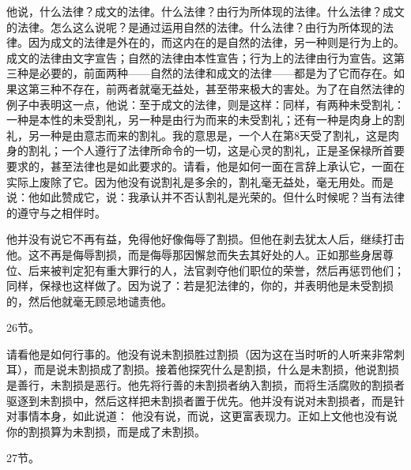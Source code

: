 他说，什么法律？成文的法律。什么法律？由行为所体现的法律。什么法律？成文的法律。怎么这么说呢？是通过运用自然的法律。什么法律？由行为所体现的法律。因为成文的法律是外在的，而这内在的是自然的法律，另一种则是行为上的。成文的法律由文字宣告；自然的法律由本性宣告；行为上的法律由行为宣告。这第三种是必要的，前面两种——自然的法律和成文的法律——都是为了它而存在。如果这第三种不存在，前两者就毫无益处，甚至带来极大的害处。为了在自然法律的例子中表明这一点，他说：至于成文的法律，则是这样：同样，有两种未受割礼：一种是本性的未受割礼，另一种是由行为而来的未受割礼；还有一种是肉身上的割礼，另一种是由意志而来的割礼。我的意思是，一个人在第8天受了割礼，这是肉身的割礼；一个人遵行了法律所命令的一切，这是心灵的割礼，正是圣保禄所首要要求的，甚至法律也是如此要求的。请看，他是如何一面在言辞上承认它，一面在实际上废除了它。因为他没有说割礼是多余的，割礼毫无益处，毫无用处。而是说：他如此赞成它，说：我承认并不否认割礼是光荣的。但什么时候呢？当有法律的遵守与之相伴时。\par

 他并没有说它不再有益，免得他好像侮辱了割损。但他在剥去犹太人后，继续打击他。这不再是侮辱割损，而是侮辱那因懈怠而失去其好处的人。正如那些身居尊位、后来被判定犯有重大罪行的人，法官剥夺他们职位的荣誉，然后再惩罚他们；同样，保禄也这样做了。因为说了：若是犯法律的，你的，并表明他是未受割损的，然后他就毫无顾忌地谴责他。\par

26节。\par

请看他是如何行事的。他没有说未割损胜过割损（因为这在当时听的人听来非常刺耳），而是说未割损成了割损。接着他探究什么是割损，什么是未割损，他说割损是善行，未割损是恶行。他先将行善的未割损者纳入割损，而将生活腐败的割损者驱逐到未割损中，然后这样把未割损者置于优先。他并没有说对未割损者，而是针对事情本身，如此说道： 他没有说，而说，这更富表现力。正如上文他也没有说你的割损算为未割损，而是成了未割损。\par

27节。\par

